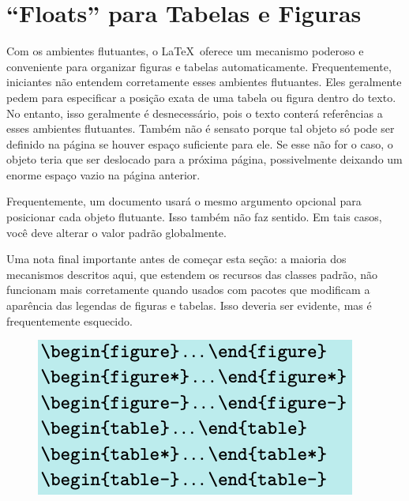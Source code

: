 \chapter{``Floats'' para Tabelas e Figuras}
Com os ambientes flutuantes, o \LaTeX\ oferece um mecanismo poderoso e conveniente para organizar figuras e tabelas automaticamente. Frequentemente, iniciantes não entendem corretamente esses ambientes flutuantes. Eles geralmente pedem para especificar a posição exata de uma tabela ou figura dentro do texto. No entanto, isso geralmente é desnecessário, pois o texto conterá referências a esses ambientes flutuantes. Também não é sensato porque tal objeto só pode ser definido na página se houver espaço suficiente para ele. Se esse não for o caso, o objeto teria que ser deslocado para a próxima página, possivelmente deixando um enorme espaço vazio na página anterior.

Frequentemente, um documento usará o mesmo argumento opcional para posicionar cada objeto flutuante. Isso também não faz sentido. Em tais casos, você deve alterar o valor padrão globalmente.

Uma nota final importante antes de começar esta seção: a maioria dos mecanismos descritos aqui, que estendem os recursos das classes padrão, não funcionam mais corretamente quando usados com pacotes que modificam a aparência das legendas de figuras e tabelas. Isso deveria ser evidente, mas é frequentemente esquecido.

\begin{figure}[h]
    \centering
    \includegraphics[width=0.5\linewidth]{imagem24.png}
\end{figure}